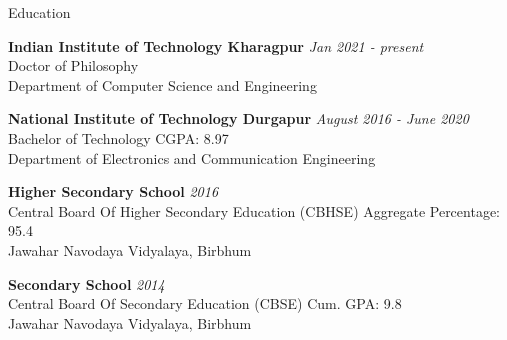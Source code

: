 \documentclass{resume} %
\begin{document}
	\begin{rSection}{Education}
		
		{\bf Indian Institute of Technology Kharagpur} \hfill {\em Jan 2021 - present} 
		\\ Doctor of Philosophy\hfill { }
		\\ Department of Computer Science and Engineering
		
		
		{\bf National Institute of Technology Durgapur} \hfill {\em August 2016 - June 2020} 
		\\ Bachelor of Technology \hfill {CGPA: 8.97}
		\\ Department of Electronics and Communication Engineering  
		
		{\bf Higher Secondary School}  \hfill {\em 2016}
		\\Central Board Of Higher Secondary Education (CBHSE) \hfill { Aggregate Percentage: 95.4}
		\\Jawahar Navodaya Vidyalaya, Birbhum
		
		{\bf Secondary School}  \hfill {\em 2014}
		\\ Central Board Of Secondary Education (CBSE) \hfill { Cum. GPA: 9.8}
		\\Jawahar Navodaya Vidyalaya, Birbhum
		
		
		
	\end{rSection}
	
\end{document}
